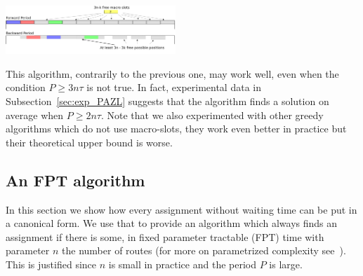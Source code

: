 \documentclass[10pt, conference, letterpaper]{IEEEtran}
\begin{document}
      \begin{center}
      \includegraphics[width=0.48\textwidth]{ex3nt.png}
      \end{center}
% 
% 
% 
	
This algorithm, contrarily to the previous one, may work well, even when the condition $P \geq 3n\tau$ is not true.
In fact, experimental data in Subsection~\ref{sec:exp_PAZL} suggests that the algorithm finds a solution on average when $P \geq 2 n\tau$.
Note that we also experimented with other greedy algorithms which do not use macro-slots, they work even better in practice but their theoretical upper bound is worse.

\subsection*{An FPT algorithm}

In this section we show how every assignment without waiting time can be put in a canonical form.
We use that to provide an algorithm which always finds an assignment if there is some, in fixed parameter tractable (FPT) time with parameter $n$ the number of routes (for more on parametrized complexity see~\cite{downey2012parameterized}). This is justified since $n$ is small in practice and the period $P$ is large.
\end{document}
